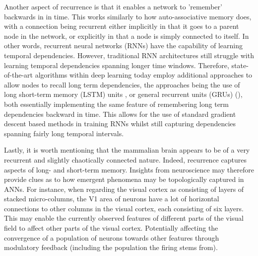 Another aspect of recurrence is that it enables a network to 'remember' backwards in in time. This works similarly to how auto-associative memory does, with a connection being recurrent either implicitly in that it goes to a parent node in the network, or explicitly in that a node is simply connected to itself. In other words, recurrent neural networks (RNNs) have the capability of learning temporal dependencies. However, traditional RNN architectures still struggle with learning temporal dependencies spanning longer time windows. Therefore, state-of-the-art algorithms within deep learning today employ additional approaches to allow nodes to recall long term dependencies, the approaches being the use of long short-term memory (LSTM) units \cite{Hochreiter1997}, or general recurrent units (GRUs) (\cite{Cho2014}), both essentially implementing the same feature of remembering long term dependencies backward in time. This allows for the use of standard gradient descent based methods in training RNNs whilst still capturing dependencies spanning fairly long temporal intervals.

Lastly, it is worth mentioning that the mammalian brain appears to be of a very recurrent and slightly chaotically connected nature. Indeed, recurrence captures aspects of long- and short-term memory. Insights from neuroscience may therefore provide clues as to how emergent phenomena may be topologically captured in ANNs.
For instance, when regarding the visual cortex as consisting of layers of stacked micro-columns, the V1 area of neurons have a lot of horizontal connections to other columns in the visual cortex, each consisting of six layers. This may enable the currently observed features of different parts of the visual field to affect other parts of the visual cortex. Potentially affecting the convergence of a population of neurons towards other features through modulatory feedback (including the population the firing stems from).



